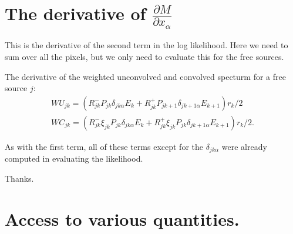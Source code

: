 \documentclass[preprint]{aastex}
\begin{document}
\section{The derivative of  $\frac{\partial M}{\partial x_{\alpha}}$}

This is the derivative of the second term in the log likelihood.  Here we need to sum over all the pixels, but we only need to evaluate this for the 
free sources.  

The derivative of the weighted unconvolved and convolved specturm for a free source $j$:
\begin{eqnarray}
  WU_{jk} = ( R_{jk}^{-} P_{jk} \delta_{jk\alpha} E_k + R_{jk}^{+} P_{jk+1} \delta_{jk+1\alpha} E_{k+1} )  r_k / 2  \nonumber \\
  WC_{jk} = ( R_{jk}^{-} \xi_{jk} P_{jk} \delta_{jk\alpha} E_k + R_{jk}^{+} \xi_{jk} P_{jk} \delta_{jk+1\alpha} E_{k+1} )  r_k / 2.
\end{eqnarray}

As with the first term, all of these terms except for the $\delta_{jk\alpha}$ were already computed in evaluating the likelihood.   

\begin{acknowledgements}
  Thanks.
\end{acknowledgements}

%

\appendix*

\section{Access to various quantities.}
\end{document}
